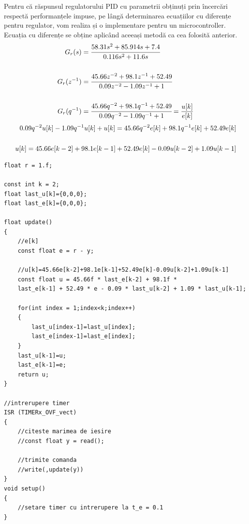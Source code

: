 \documentclass[11pt]{article}
\begin{document}
Pentru că răspunsul regulatorului PID cu parametrii obținuți prin încercări respectă performanțele impuse, pe lângă determinarea ecuațiilor cu diferențe pentru regulator, vom realiza și o implementare pentru un microcontroller.
Ecuația cu diferențe se obține aplicând aceeași metodă ca cea folosită anterior.
\begin{align}
G_r(s)&=\cfrac{58.31s^2+85.914s+7.4}{0.116s^2+11.6s}\notag\\
\notag\\
G_r(z^{-1})&=\cfrac{45.66z^{-2}+98.1z^{-1}+52.49}{0.09z^{-2}-1.09z^{-1}+1}\notag\\
\notag\\
G_r(q^{-1})&=\cfrac{45.66q^{-2}+98.1q^{-1}+52.49}{0.09q^{-2}-1.09q^{-1}+1}=\frac{u[k]}{e[k]}\notag
\end{align}
\begin{align}
0.09q^{-2}u[k]-1.09q^{-1}u[k]+u[k]=45.66q^{-2}e[k]+98.1q^{-1}e[k]+52.49e[k]\notag\\
\notag\\
u[k]=45.66e[k-2]+98.1e[k-1]+52.49e[k]-0.09u[k-2]+1.09u[k-1]\notag
\end{align}
\newpage
\begin{lstlisting}
float r = 1.f;

const int k = 2;
float last_u[k]={0,0,0};
float last_e[k]={0,0,0};

float update()
{
	//e[k]
	const float e = r - y;
	
	//u[k]=45.66e[k-2]+98.1e[k-1]+52.49e[k]-0.09u[k-2]+1.09u[k-1]
	const float u = 45.66f * last_e[k-2] + 98.1f * 
	last_e[k-1] + 52.49 * e - 0.09 * last_u[k-2] + 1.09 * last_u[k-1];
	
	for(int index = 1;index<k;index++)
	{
		last_u[index-1]=last_u[index];
		last_e[index-1]=last_e[index];
	}
	last_u[k-1]=u;
	last_e[k-1]=e;
	return u;
}

//intrerupere timer
ISR (TIMERx_OVF_vect)
{
	//citeste marimea de iesire
	//const float y = read();
	
	//trimite comanda
	//write(,update(y))
}
void setup()
{
	//setare timer cu intrerupere la t_e = 0.1
}
\end{lstlisting}

\newpage
\end{document}
